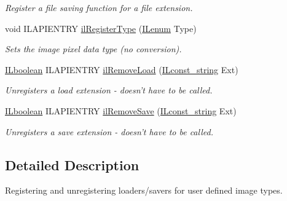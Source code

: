 \begin{DoxyCompactItemize}
\begin{DoxyCompactList}\small\item\em Register a file saving function for a file extension. \end{DoxyCompactList}\item 
void I\+L\+A\+P\+I\+E\+N\+T\+R\+Y \hyperlink{group__register_gac327753a4ba7fa0e4aa04ee8a351d619}{il\+Register\+Type} (\hyperlink{group__il__types_ga62ca73445716183ef42b1f3906a45ed0}{I\+Lenum} Type)
\begin{DoxyCompactList}\small\item\em Sets the image pixel data type (no conversion). \end{DoxyCompactList}\item 
\hypertarget{group__register_ga388f0a90bbfee28bc2bebf0dd2b336e2}{\hyperlink{group__il__types_gaa6aa7c95cfdc06b4d8601ef832b7bb0a}{I\+Lboolean} I\+L\+A\+P\+I\+E\+N\+T\+R\+Y \hyperlink{group__register_ga388f0a90bbfee28bc2bebf0dd2b336e2}{il\+Remove\+Load} (\hyperlink{group__il__types_ga1aa1edc3eb344e14acacb02bade24a5a}{I\+Lconst\+\_\+string} Ext)}\label{group__register_ga388f0a90bbfee28bc2bebf0dd2b336e2}

\begin{DoxyCompactList}\small\item\em Unregisters a load extension -\/ doesn't have to be called. \end{DoxyCompactList}\item 
\hypertarget{group__register_gafbac37b1a3b743f6ef6f270de7e40c08}{\hyperlink{group__il__types_gaa6aa7c95cfdc06b4d8601ef832b7bb0a}{I\+Lboolean} I\+L\+A\+P\+I\+E\+N\+T\+R\+Y \hyperlink{group__register_gafbac37b1a3b743f6ef6f270de7e40c08}{il\+Remove\+Save} (\hyperlink{group__il__types_ga1aa1edc3eb344e14acacb02bade24a5a}{I\+Lconst\+\_\+string} Ext)}\label{group__register_gafbac37b1a3b743f6ef6f270de7e40c08}

\begin{DoxyCompactList}\small\item\em Unregisters a save extension -\/ doesn't have to be called. \end{DoxyCompactList}\end{DoxyCompactItemize}


\subsection{Detailed Description}
Registering and unregistering loaders/savers for user defined image types. 



